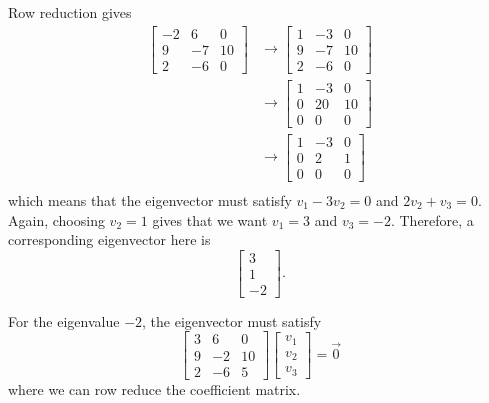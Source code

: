 \begin{exampleSol}
Row reduction gives
\[ \begin{split}
\begin{bmatrix} -2 & 6 & 0 \\ 9 & -7 & 10 \\ 2 & -6 & 0 \end{bmatrix} &\rightarrow \begin{bmatrix} 1 & -3 & 0 \\ 9 & -7 & 10 \\ 2 & -6 & 0 \end{bmatrix} \\
&\rightarrow \begin{bmatrix} 1 & -3 & 0 \\ 0 & 20 & 10 \\ 0 & 0 & 0 \end{bmatrix} \\
&\rightarrow \begin{bmatrix} 1 & -3 & 0 \\ 0 & 2 & 1 \\ 0 & 0 & 0 \end{bmatrix} \\
\end{split}
\] which means that the eigenvector must satisfy $v_1 - 3v_2 = 0$ and $2v_2 + v_3 = 0$. Again, choosing $v_2 = 1$ gives that we want $v_1 = 3$ and $v_3 = -2$. Therefore, a corresponding eigenvector here is 
\[ \begin{bmatrix} 3 \\ 1 \\ -2 \end{bmatrix}. \]

For the eigenvalue $-2$, the eigenvector must satisfy
\[ \begin{bmatrix} 3 & 6 & 0 \\ 9 & -2 & 10 \\ 2 & -6 & 5 \end{bmatrix} \begin{bmatrix} v_1 \\ v_2 \\ v_3 \end{bmatrix} = \vec{0} \] where we can row reduce the coefficient matrix.


\end{exampleSol}
